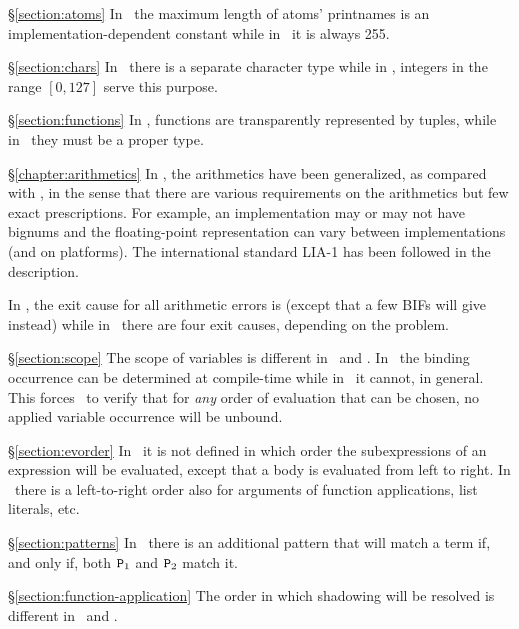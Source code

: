 \begin{Lentry}
\item[\S\ref{section:atoms}]
In \StdErlang\ the maximum length of atoms' printnames is an implementation-dependent
constant while in \OldErlang\ it is always 255.

\item[\S\ref{section:chars}]
In \StdErlang\ there is a separate character type while in \OldErlang, integers in the
range $[0,127]$ serve this purpose.

\item[\S\ref{section:functions}]
In \OldErlang, functions are transparently represented by tuples, while in
\StdErlang\ they must be a proper type.

\item[\S\ref{chapter:arithmetics}]
In \StdErlang, the arithmetics have been generalized, as compared with
\OldErlang, in the sense that there are
various requirements on the arithmetics but few exact prescriptions.
For example, an implementation may
or may not have bignums and the floating-point representation can vary
between implementations (and on platforms). The international standard LIA-1 has been followed in
the description.

In \OldErlang, the exit cause for all arithmetic errors is  (except that
a few BIFs will give  instead) while in
\StdErlang\ there are four exit causes, depending on the problem.

\item[\S\ref{section:scope}]
The scope of variables is different in \OldErlang\ and \StdErlang. In \StdErlang\
the binding occurrence can be determined at compile-time while in \OldErlang\ it
cannot, in general.  This forces \OldErlang\ to verify that for \emph{any} order of
evaluation that can be chosen, no applied variable occurrence will be unbound.

\item[\S\ref{section:evorder}]
In \OldErlang\ it is not defined in which order the subexpressions of an expression
will be evaluated, except that a body is evaluated from left to right.  In \StdErlang\
there is a left-to-right order also for arguments of function applications, list
literals, etc.

\item[\S\ref{section:patterns}]
In \StdErlang\ there is an additional pattern  that will
match a term if, and only if, both ${\tt{\sl P}}_1$ and ${\tt{\sl P}}_2$ match it.

\item[\S\ref{section:function-application}]
The order in which shadowing will be resolved is different in \OldErlang\ and
\StdErlang.


\end{Lentry}
